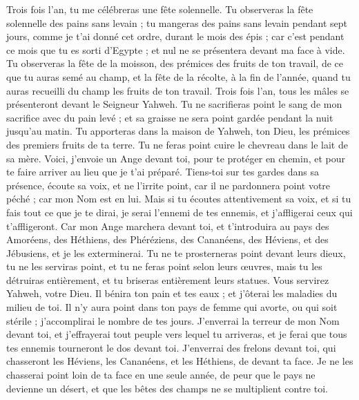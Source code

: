 \begin{multicols}{2}
Trois fois l'an, tu me célébreras une fête solennelle.
Tu observeras la fête solennelle des pains sans levain ; tu mangeras des pains sans levain pendant sept jours, comme je t'ai donné cet ordre, durant le mois des épis ; car c’est pendant ce mois que tu es sorti d'Egypte ; et nul ne se présentera devant ma face à vide.
Tu observeras la fête de la moisson, des prémices des fruits de ton travail, de ce que tu auras semé au champ, et la fête de la récolte, à la fin de l'année, quand tu auras recueilli du champ les fruits de ton travail.
Trois fois l'an, tous les mâles se présenteront devant le Seigneur Yahweh.
Tu ne sacrifieras point le sang de mon sacrifice avec du pain levé ; et sa graisse ne sera point gardée pendant la nuit jusqu’au matin.
Tu apporteras dans la maison de Yahweh, ton Dieu, les prémices des premiers fruits de ta terre. Tu ne feras point cuire le chevreau dans le lait de sa mère.
Voici, j'envoie un Ange devant toi, pour te protéger en chemin, et pour te faire arriver au lieu que je t'ai préparé.
Tiens-toi sur tes gardes dans sa présence, écoute sa voix, et ne l'irrite point, car il ne pardonnera point votre péché ; car mon Nom est en lui.
Mais si tu écoutes attentivement sa voix, et si tu fais tout ce que je te dirai, je serai l'ennemi de tes ennemis, et j'affligerai ceux qui t'affligeront.
Car mon Ange marchera devant toi, et t'introduira au pays des Amoréens, des Héthiens, des Phéréziens, des Cananéens, des Héviens, et des Jébusiens, et je les exterminerai.
Tu ne te prosterneras point devant leurs dieux, tu ne les serviras point, et tu ne feras point selon leurs œuvres, mais tu les détruiras entièrement, et tu briseras entièrement leurs statues.
Vous servirez Yahweh, votre Dieu. Il bénira ton pain et tes eaux ; et j'ôterai les maladies du milieu de toi.
Il n'y aura point dans ton pays de femme qui avorte, ou qui soit stérile ; j'accomplirai le nombre de tes jours.
J'enverrai la terreur de mon Nom devant toi, et j'effrayerai tout peuple vers lequel tu arriveras, et je ferai que tous tes ennemis tourneront le dos devant toi.
J'enverrai des frelons devant toi, qui chasseront les Héviens, les Cananéens, et les Héthiens, de devant ta face.
Je ne les chasserai point loin de ta face en une seule année, de peur que le pays ne devienne un désert, et que les bêtes des champs ne se multiplient contre toi.

\end{multicols}
